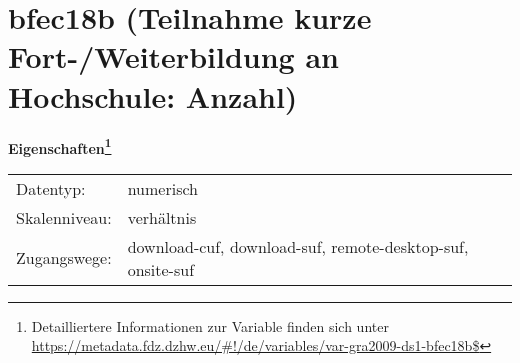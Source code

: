 
    \setcounter{footnote}{0}

    \vspace*{-1.8cm}
	\section{bfec18b (Teilnahme kurze Fort-/Weiterbildung an Hochschule: Anzahl)}
	\label{section:bfec18b}



    \vspace*{0.5cm}
    \noindent\textbf{Eigenschaften\footnote{Detailliertere Informationen zur Variable finden sich unter
		\url{https://metadata.fdz.dzhw.eu/\#!/de/variables/var-gra2009-ds1-bfec18b$}}}\\
	\begin{tabularx}{\hsize}{@{}lX}
	Datentyp: & numerisch \\
	Skalenniveau: & verhältnis \\
	Zugangswege: &
	  download-cuf, 
	  download-suf, 
	  remote-desktop-suf, 
	  onsite-suf
 \\
    \end{tabularx}



